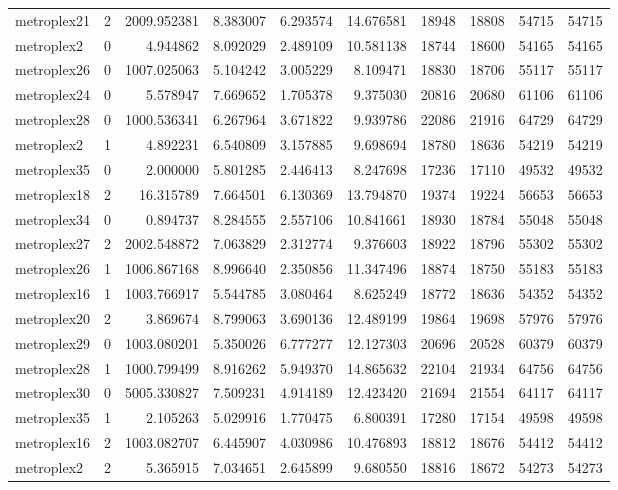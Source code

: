 \begin{longtable}{|l|r|r|r|r|r|r|r|r|r|}
metroplex21 & 2 & 2009.952381 & 8.383007 & 6.293574 & 14.676581 & 18948 & 18808 & 54715 & 54715 \\
metroplex2 & 0 & 4.944862 & 8.092029 & 2.489109 & 10.581138 & 18744 & 18600 & 54165 & 54165 \\
metroplex26 & 0 & 1007.025063 & 5.104242 & 3.005229 & 8.109471 & 18830 & 18706 & 55117 & 55117 \\
metroplex24 & 0 & 5.578947 & 7.669652 & 1.705378 & 9.375030 & 20816 & 20680 & 61106 & 61106 \\
metroplex28 & 0 & 1000.536341 & 6.267964 & 3.671822 & 9.939786 & 22086 & 21916 & 64729 & 64729 \\
metroplex2 & 1 & 4.892231 & 6.540809 & 3.157885 & 9.698694 & 18780 & 18636 & 54219 & 54219 \\
metroplex35 & 0 & 2.000000 & 5.801285 & 2.446413 & 8.247698 & 17236 & 17110 & 49532 & 49532 \\
metroplex18 & 2 & 16.315789 & 7.664501 & 6.130369 & 13.794870 & 19374 & 19224 & 56653 & 56653 \\
metroplex34 & 0 & 0.894737 & 8.284555 & 2.557106 & 10.841661 & 18930 & 18784 & 55048 & 55048 \\
metroplex27 & 2 & 2002.548872 & 7.063829 & 2.312774 & 9.376603 & 18922 & 18796 & 55302 & 55302 \\
metroplex26 & 1 & 1006.867168 & 8.996640 & 2.350856 & 11.347496 & 18874 & 18750 & 55183 & 55183 \\
metroplex16 & 1 & 1003.766917 & 5.544785 & 3.080464 & 8.625249 & 18772 & 18636 & 54352 & 54352 \\
metroplex20 & 2 & 3.869674 & 8.799063 & 3.690136 & 12.489199 & 19864 & 19698 & 57976 & 57976 \\
metroplex29 & 0 & 1003.080201 & 5.350026 & 6.777277 & 12.127303 & 20696 & 20528 & 60379 & 60379 \\
metroplex28 & 1 & 1000.799499 & 8.916262 & 5.949370 & 14.865632 & 22104 & 21934 & 64756 & 64756 \\
metroplex30 & 0 & 5005.330827 & 7.509231 & 4.914189 & 12.423420 & 21694 & 21554 & 64117 & 64117 \\
metroplex35 & 1 & 2.105263 & 5.029916 & 1.770475 & 6.800391 & 17280 & 17154 & 49598 & 49598 \\
metroplex16 & 2 & 1003.082707 & 6.445907 & 4.030986 & 10.476893 & 18812 & 18676 & 54412 & 54412 \\
metroplex2 & 2 & 5.365915 & 7.034651 & 2.645899 & 9.680550 & 18816 & 18672 & 54273 & 54273 \\

\end{longtable}
